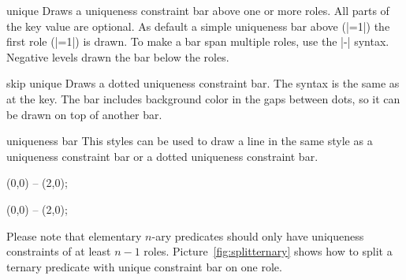 \documentclass[a4paper,10pt]{article}
\begin{document}

\begin{stylekey}{unique}
Draws a uniqueness constraint bar above one or more roles. All parts of the key value are optional. As default a simple uniqueness bar above (|=1|) the first role (|=1|) is drawn. To make a bar span multiple roles, use the |-| syntax. Negative levels drawn the bar below the roles.
\begin{codeexample}[]
\end{codeexample}
\end{stylekey}

\begin{stylekey}{skip unique}
Draws a dotted uniqueness constraint bar. The syntax is the same as at the  key.
The bar includes background color in the gaps between dots, so it can be drawn on top of 
another bar.
\begin{codeexample}[]
\begin{tikzpicture}[orm]
\ternary[unique=1-3,skip unique=2] {};
\end{tikzpicture}
\end{codeexample}
\end{stylekey}

\begin{stylekey}{uniqueness bar}
This styles can be used to draw a line in the same style as a uniqueness constraint bar or a dotted uniqueness constraint bar.
\begin{codeexample}[width=3cm]
\tikz{} (0,0) -- (2,0);
\end{codeexample}
\begin{codeexample}[width=3cm]
\tikz{} (0,0) -- (2,0);
\end{codeexample}
\end{stylekey}

\noindent
Please note that elementary $n$-ary predicates should only have uniqueness constraints of at least $n-1$ roles. Picture~\ref{fig:splitternary} shows how to split a ternary predicate with unique constraint bar on one role.
\end{document}
